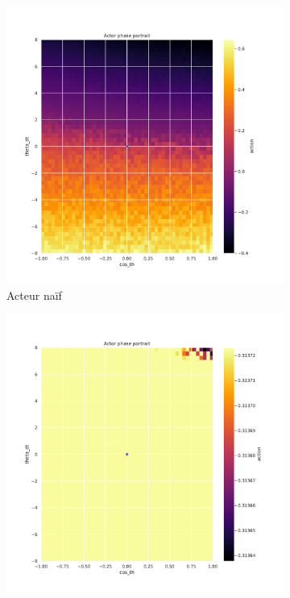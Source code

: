 \begin{figure}[H]
    \centering
    \begin{subfigure}{0.3\textwidth}
        \includegraphics[width=\textwidth]{figures/iteration3/0_actor_normalize__ante_Pendulum-v0.pdf}
        \caption{Acteur naïf}
    \end{subfigure}
    \begin{subfigure}{0.3\textwidth}
        \includegraphics[width=\textwidth]{figures/iteration3/0_actor_normalize__post_Pendulum-v0.pdf}

\end{subfigure}
\end{figure}
